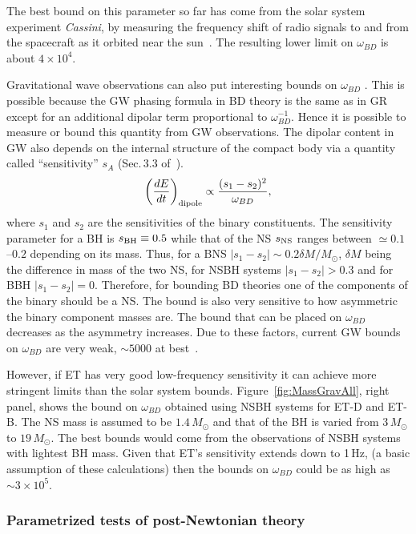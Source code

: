 The best bound on this parameter so far has come from the solar
system experiment \emph{Cassini}, by measuring the frequency shift of radio
signals to and from the spacecraft as it orbited near the sun~\cite{Cassini}.
The resulting lower limit on $\omega_{BD}$ is about $4\times10^{4}$.

Gravitational wave observations can also put interesting bounds on $\omega_{BD}$
\cite{WillBD94,KKS95}. This is possible because
the GW phasing formula in BD theory is the same as in GR except
for an additional dipolar term proportional to $\omega_{BD}^{-1}$.
Hence it is possible to measure or bound this quantity from GW observations. %
The dipolar content in GW also depends on the internal structure of the compact
body via a quantity called ``sensitivity'' $s_A$ (Sec.\,3.3 of~\cite{Wthexp}).
\begin{equation}
\left(\frac{dE}{dt}\right)_{\rm dipole} \propto {\frac{(s_1-s_2)^2}{\omega_{BD}}}, 
\end{equation}
where $s_1$ and $s_2$ are the sensitivities of the
binary constituents. The sensitivity parameter for a BH is 
$s_{\rm BH} \equiv 0.5$ while that of the NS $s_{\rm NS}$ ranges between $\simeq 0.1$--$0.2$ 
depending on its mass.  Thus, for a BNS $|s_1-s_2| \sim 0.2 \delta M/M_\odot$, 
$\delta M$ being the difference in mass of the two NS, for NSBH 
systems $|s_1-s_2|>0.3$ and for BBH $|s_1-s_2|=0$.
Therefore, for bounding BD theories one of the components of the binary
should be a NS. The bound is also very sensitive to how asymmetric the 
binary component masses are.  The bound that can be placed on $\omega_{BD}$ 
decreases as the asymmetry increases.  Due to these factors, current
GW bounds on $\omega_{BD}$ are very weak, $\sim 5000$ at best~\cite{WillBD94}.

However, if ET has very good low-frequency sensitivity it can achieve more stringent 
limits than the solar system bounds. Figure~\ref{fig:MassGravAll},
right panel, shows the bound on $\omega_{BD}$ obtained using NSBH systems for
ET-D and ET-B.  The NS mass is assumed to be $1.4\,M_{\odot}$ and that of the BH is 
varied from $3\,M_\odot$ to $19\,M_\odot$.  The best bounds would come from 
the observations of NSBH systems with lightest BH mass.
Given that ET's sensitivity extends down to 1\,Hz, (a basic assumption of these
calculations) then the bounds on $\omega_{BD}$ could be as high as $\sim 3\times 10^5$.

\subsubsection{Parametrized tests of post-Newtonian theory}


